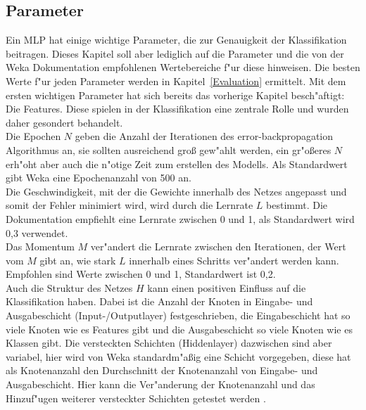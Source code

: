 \subsection{Parameter}
\label{Parameter}
Ein MLP hat einige wichtige Parameter, die zur Genauigkeit der Klassifikation beitragen. Dieses Kapitel soll aber lediglich auf die Parameter und die von der Weka Dokumentation \cite{WekaMLP}
empfohlenen Wertebereiche f"ur diese hinweisen. Die besten Werte f"ur jeden Parameter werden in Kapitel~\ref{Evaluation} ermittelt. Mit dem ersten wichtigen Parameter hat sich bereits das vorherige Kapitel besch"aftigt: Die Features. Diese spielen in der Klassifikation eine zentrale Rolle und wurden daher gesondert behandelt.\\
Die Epochen $N$ geben die Anzahl der Iterationen des error-backpropagation Algorithmus an, sie sollten ausreichend gro{\ss} gew"ahlt werden, ein gr"o{\ss}eres $N$ erh"oht aber auch die n"otige Zeit zum erstellen des Modells. Als Standardwert gibt Weka eine Epochenanzahl von 500 an.\\ 
Die Geschwindigkeit, mit der die Gewichte innerhalb des Netzes angepasst und somit der Fehler minimiert wird, wird durch die Lernrate $L$ bestimmt. Die Dokumentation empfiehlt eine Lernrate zwischen 0 und 1, als Standardwert wird 0,3 verwendet.\\
Das Momentum $M$ ver"andert die Lernrate zwischen den Iterationen, der Wert vom $M$ gibt an, wie stark $L$ innerhalb eines Schritts ver"andert werden kann. Empfohlen sind Werte zwischen 0 und 1, Standardwert ist 0,2.\\
Auch die Struktur des Netzes $H$ kann einen positiven Einfluss auf die Klassifikation haben. Dabei ist die Anzahl der Knoten in  Eingabe- und Ausgabeschicht (Input-/Outputlayer) festgeschrieben, die Eingabeschicht hat so viele Knoten wie es Features gibt und die Ausgabeschicht so viele Knoten wie es Klassen gibt. Die versteckten Schichten (Hiddenlayer) dazwischen sind aber variabel, hier wird von Weka standardm"a{\ss}ig eine Schicht vorgegeben, diese hat als Knotenanzahl den Durchschnitt der Knotenanzahl von  Eingabe- und Ausgabeschicht. Hier kann die Ver"anderung der Knotenanzahl und das Hinzuf"ugen weiterer versteckter Schichten getestet werden \cite{kruse2011computational}.\\
